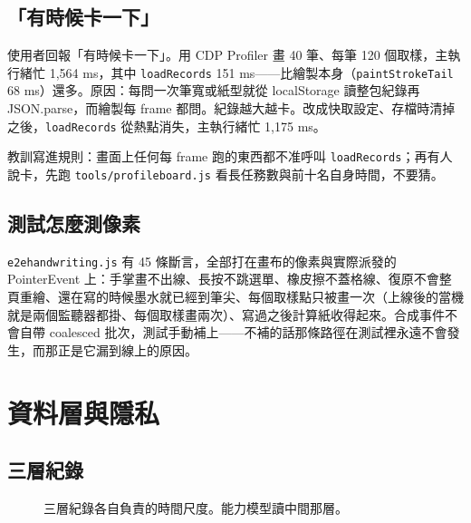 \documentclass[11pt,a4paper,oneside]{report}
\renewcommand{\_}{\ifmmode\origunderscore\else\textunderscore\allowbreak\fi}
\newcommand{\code}[1]{\texttt{#1}}
\newcommand{\file}[1]{\texttt{\small #1}}
\begin{document}
\section{「有時候卡一下」}
\begin{pitfall}[真兇不是繪製]
使用者回報「有時候卡一下」。用 CDP Profiler 畫 40 筆、每筆 120 個取樣，主執行緒忙 1,564 ms，其中 \code{loadRecords} 151 ms——比繪製本身（\code{paintStrokeTail} 68 ms）還多。原因：每問一次筆寬或紙型就從 localStorage 讀整包紀錄再 JSON.parse，而繪製每 frame 都問。紀錄越大越卡。改成快取設定、存檔時清掉之後，\code{loadRecords} 從熱點消失，主執行緒忙 1,175 ms。
\end{pitfall}
教訓寫進規則：畫面上任何每 frame 跑的東西都不准呼叫 \code{loadRecords}；再有人說卡，先跑 \file{tools/profile\_board.js} 看長任務數與前十名自身時間，不要猜。

\section{測試怎麼測像素}
\file{e2e\_handwriting.js} 有 45 條斷言，全部打在畫布的像素與實際派發的 PointerEvent 上：手掌畫不出線、長按不跳選單、橡皮擦不蓋格線、復原不會整頁重繪、還在寫的時候墨水就已經到筆尖、每個取樣點只被畫一次（上線後的當機就是兩個監聽器都掛、每個取樣畫兩次）、寫過之後計算紙收得起來。合成事件不會自帶 coalesced 批次，測試手動補上——不補的話那條路徑在測試裡永遠不會發生，而那正是它漏到線上的原因。

\chapter{資料層與隱私}
\section{三層紀錄}
\begin{figure}[h]
\centering
{}
\caption{三層紀錄各自負責的時間尺度。能力模型讀中間那層。}
\end{figure}
\end{document}
